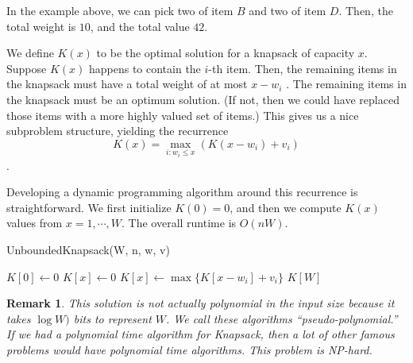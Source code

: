 \documentclass [12pt]{article}
\newtheorem{remark}{Remark}
\theoremstyle{definition}
\begin{document}
In the example above, we can pick two of item $B$ and two of item $D$. Then, the total weight is $10$, and the total value $42$. 

We define $K(x)$ to be the optimal solution for a knapsack of capacity $x$. Suppose $K(x)$ happens to contain the $i$-th item. Then, the remaining items in the knapsack must have a total weight of at most $x -  w_i$ . The remaining items in the knapsack must be an optimum solution. (If not, then we could have replaced those items with a more highly valued set of items.) This gives us a nice subproblem structure, yielding the recurrence
$$
K(x) = \max_{i:w_i\leq x}(K(x - w_i ) + v_i )
$$.

Developing a dynamic programming algorithm around this recurrence is straightforward. We first initialize $K(0) = 0$, and then we compute $K(x)$ values from $x = 1, \cdots , W$. The overall runtime is $O(nW)$.

\begin{algorithm}
\caption{UnboundedKnapsack(W, n, w, v)}
\label{alg:unboundedknapsack}
\begin{algorithmic}
\STATE $K[0]\gets 0$
  \STATE $K[x] \gets 0$
      \STATE $K[x] \gets \max\{K[x-w_i] + v_i \}$
    \ENDIF
  \ENDFOR
\ENDFOR
\RETURN $K[W]$
\end{algorithmic}
\end{algorithm}

\begin{remark}This solution is not actually polynomial in the input size because it takes $\log W)$ bits to represent $W$. We call these algorithms ``pseudo-polynomial.'' If we had a polynomial time algorithm for Knapsack, then a lot of other famous problems would have polynomial time algorithms. This problem is NP-hard.
\end{remark}
\end{document}
